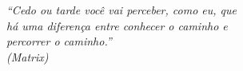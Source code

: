 \documentclass[
	12pt,				%
	openright,			%
	twoside,			%
	a4paper,			%
	chapter=TITLE,		%
	sumario=abnt-6027-2012,
	english,			%
	brazil				%
	]{UFVJM-abntex2}
\begin{document}
\begin{epigrafe}
    \vspace*{\fill}
	\begin{flushright}
		\textit{``Cedo ou tarde você vai perceber, como eu, que\\
		 há uma diferença entre conhecer o caminho e\\
		 percorrer o caminho.''\\
		(Matrix)}
	\end{flushright}
\end{epigrafe}


\begin{resumo}[RESUMO]


\end{resumo}
\end{document}
